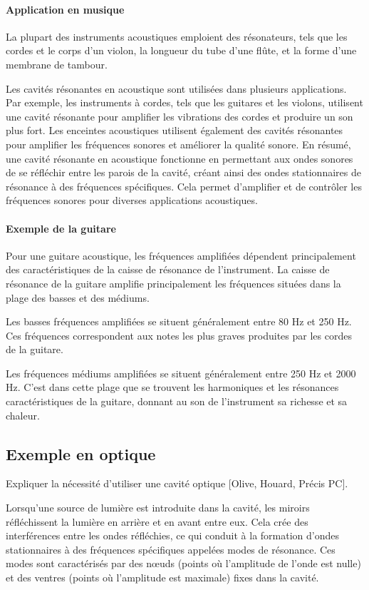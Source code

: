 \documentclass[11pt]{report}
\numberwithin{figure}{section}
\numberwithin{equation}{section}
\numberwithin{table}{section}
\newcommand{\1}{\boldsymbol{1}}
\begin{document}
\paragraph*{Application en musique} La plupart des instruments acoustiques emploient des résonateurs, tels que les cordes et le corps d'un violon, la longueur du tube d'une flûte, et la forme d'une membrane de tambour.

Les cavités résonantes en acoustique sont utilisées dans plusieurs applications. Par exemple, les instruments à cordes, tels que les guitares et les violons, utilisent une cavité résonante pour amplifier les vibrations des cordes et produire un son plus fort. Les enceintes acoustiques utilisent également des cavités résonantes pour amplifier les fréquences sonores et améliorer la qualité sonore. En résumé, une cavité résonante en acoustique fonctionne en permettant aux ondes sonores de se réfléchir entre les parois de la cavité, créant ainsi des ondes stationnaires de résonance à des fréquences spécifiques. Cela permet d'amplifier et de contrôler les fréquences sonores pour diverses applications acoustiques.

\paragraph{Exemple de la guitare} Pour une guitare acoustique, les fréquences amplifiées dépendent principalement des caractéristiques de la caisse de résonance de l'instrument. La caisse de résonance de la guitare amplifie principalement les fréquences situées dans la plage des basses et des médiums.

Les basses fréquences amplifiées se situent généralement entre 80 Hz et 250 Hz. Ces fréquences correspondent aux notes les plus graves produites par les cordes de la guitare.

Les fréquences médiums amplifiées se situent généralement entre 250 Hz et 2000 Hz. C'est dans cette plage que se trouvent les harmoniques et les résonances caractéristiques de la guitare, donnant au son de l'instrument sa richesse et sa chaleur.


\subsection{Exemple en optique}

Expliquer la nécessité d'utiliser une cavité optique [Olive, Houard, Précis PC].

Lorsqu'une source de lumière est introduite dans la cavité, les miroirs réfléchissent la lumière en arrière et en avant entre eux. Cela crée des interférences entre les ondes réfléchies, ce qui conduit à la formation d'ondes stationnaires à des fréquences spécifiques appelées modes de résonance. Ces modes sont caractérisés par des nœuds (points où l'amplitude de l'onde est nulle) et des ventres (points où l'amplitude est maximale) fixes dans la cavité.
\end{document}
